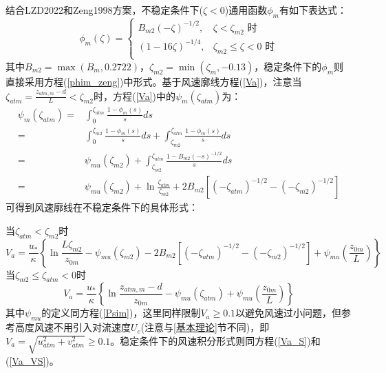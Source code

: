 结合LZD2022和Zeng1998方案，不稳定条件下($\zeta<0$)通用函数$\phi_{m}$有如下表达式：
\begin{equation}
\phi_{m}(\zeta)= \begin{cases}
   B_{m2}(-\zeta)^{-1/2}, & \zeta<\zeta_{m2} \text { 时} \\
   (1-16 \zeta)^{-1/4}, & \zeta_{m2} \leq \zeta<0 \text { 时} \\
\end{cases}
\end{equation}
其中$B_{m2}=\max(B_{m},0.2722)$，$\zeta_{m2}=\min(\zeta_{m},-0.13)$，稳定条件下的$\phi_{m}$则直接采用方程(\ref{phim_zeng})中形式。基于风速廓线方程(\ref{Va})，注意当
$\zeta_{atm}=\frac{z_{atm,m}-d}{L}<\zeta_{m2}$时，方程(\ref{Va})中的$\psi_{m}\left(\zeta_{atm}\right)$为：
\begin{align}
\psi_{m}\left(\zeta_{atm}\right) =& \int_{0}^{\zeta_{atm}} \frac{1-\phi_{m}(s)}{s} d s  \nonumber \\
 =& \int_{0}^{\zeta_{m2}} \frac{1-\phi_{m}(s)}{s} d s + \int_{\zeta_{m2}}^{\zeta_{atm}} \frac{1-\phi_{m}(s)}{s} d s  \nonumber \\
 =& \psi_{mu}(\zeta_{m2}) + \int_{\zeta_{m2}}^{\zeta_{atm}} \frac{1-B_{m2}(-s)^{-1/2}}{s} d s  \nonumber \\
 =& \psi_{mu}(\zeta_{m2}) + \ln \frac{\zeta_{atm}}{\zeta_{m2}} + 2B_{m2}\left[(-\zeta_{atm})^{-1/2}-(-\zeta_{m2})^{-1/2}\right]
\end{align}
可得到风速廓线在不稳定条件下的具体形式：

\noindent 当$\zeta_{atm}<\zeta_{m2}$时
\begin{equation}\label{Va_U_LZD1}
V_{a}=\frac{u_{*}}{\kappa}\left\{\ln \frac{L\zeta_{m2}}{z_{0 m}}-\psi_{mu}\left(\zeta_{m2}\right)-2B_{m2}\left[(-\zeta_{atm})^{-1/2}-(-\zeta_{m2})^{-1/2}\right]+\psi_{mu}\left(\frac{z_{0 m}}{L}\right)\right\}
\end{equation}
\noindent 当$ \zeta_{m2} \leq \zeta_{atm}<0$时
\begin{equation}\label{Va_U_LZD2}
V_{a}=\frac{u_{*}}{\kappa}\left\{\ln \frac{z_{atm, m}-d}{z_{0 m}}-\psi_{mu}\left(\zeta_{atm}\right)+\psi_{mu}\left(\frac{z_{0 m}}{L}\right)\right\}
\end{equation}
其中$\psi_{mu}$的定义同方程(\ref{Psim})，这里同样限制$V_a\geq0.1$以避免风速过小问题，但参考高度风速不用引入对流速度$U_c$(注意与\ref{基本理论}节不同)，即
$V_{a}=\sqrt{u_{atm}^{2}+v_{atm}^{2}} \geq 0.1$。稳定条件下的风速积分形式则同方程(\ref{Va_S})和(\ref{Va_VS})。

